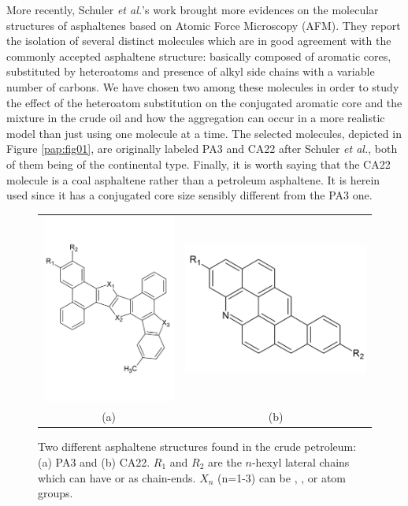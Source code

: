 More recently, Schuler \textit{et al.}'s\cite{schuler2015unraveling} work brought more evidences on the molecular structures of asphaltenes based on Atomic Force Microscopy (AFM). They report the isolation of several distinct molecules which are in good agreement with the commonly accepted asphaltene structure: basically composed of aromatic cores, substituted by heteroatoms and presence of alkyl side chains with a variable number of carbons. We have chosen two among these molecules in order to study the effect of the heteroatom substitution on the conjugated aromatic core and the mixture in the crude oil and how the aggregation can occur in a more realistic model than just using one molecule at a time. The selected molecules, depicted in Figure \ref{pap:fig01}, are originally labeled PA3 and CA22 after Schuler \textit{et al.},\cite{schuler2015unraveling} both of them being of the continental type.\cite{mullins2010modified,mullins2011asphaltenes,mullins2012advances} Finally, it is worth saying that the CA22 molecule is a coal asphaltene rather than a petroleum asphaltene. It is herein used since it has a conjugated core size sensibly different from the PA3 one.

\begin{figure}[htb]
	\centering
	\begin{tabular}{cc}
		\includegraphics[width=0.35\columnwidth]{image/PA3} &
		\includegraphics[width=0.35\columnwidth]{image/CA22}\\
		(a) & (b)\\
	\end{tabular}
	\caption{Two different asphaltene structures found in the crude petroleum: (a) PA3 and (b) CA22. $R_1$ and $R_2$ are the $n$-hexyl lateral chains which can have  or  as chain-ends. $X_n$ (n=1-3) can be , , or  atom groups.}
	\label{pap:fig02}
\end{figure}


